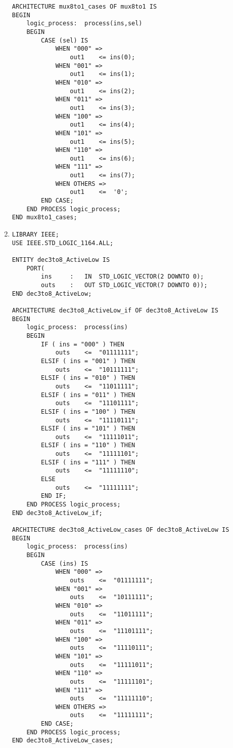 \begin{enumerate}
\begin{lstlisting}
ARCHITECTURE mux8to1_cases OF mux8to1 IS
BEGIN
	logic_process:	process(ins,sel) 
	BEGIN
		CASE (sel) IS
			WHEN "000" =>
				out1	<= ins(0);
			WHEN "001" =>
				out1	<= ins(1);
			WHEN "010" =>
				out1	<= ins(2);
			WHEN "011" =>
				out1	<= ins(3);
			WHEN "100" =>
				out1	<= ins(4);
			WHEN "101" =>
				out1	<= ins(5);
			WHEN "110" =>
				out1	<= ins(6);
			WHEN "111" =>
				out1	<= ins(7);
			WHEN OTHERS =>
				out1	<=	'0';
		END CASE;
	END PROCESS logic_process;
END mux8to1_cases;
	\end{lstlisting}

	\item
	\begin{lstlisting}
LIBRARY IEEE;
USE IEEE.STD_LOGIC_1164.ALL;

ENTITY dec3to8_ActiveLow IS
	PORT(
		ins		:	IN	STD_LOGIC_VECTOR(2 DOWNTO 0);
		outs	:	OUT	STD_LOGIC_VECTOR(7 DOWNTO 0));
END dec3to8_ActiveLow;

ARCHITECTURE dec3to8_ActiveLow_if OF dec3to8_ActiveLow IS
BEGIN
	logic_process:	process(ins) 
	BEGIN
		IF ( ins = "000" ) THEN
			outs	<=	"01111111";
		ELSIF ( ins = "001" ) THEN
			outs	<=	"10111111";
		ELSIF ( ins = "010" ) THEN
			outs	<=	"11011111";
		ELSIF ( ins = "011" ) THEN
			outs	<=	"11101111";
		ELSIF ( ins = "100" ) THEN
			outs	<=	"11110111";
		ELSIF ( ins = "101" ) THEN
			outs	<=	"11111011";
		ELSIF ( ins = "110" ) THEN
			outs	<=	"11111101";
		ELSIF ( ins = "111" ) THEN
			outs	<=	"11111110";
		ELSE
			outs	<=	"11111111";
		END IF;
	END PROCESS logic_process;
END dec3to8_ActiveLow_if;

ARCHITECTURE dec3to8_ActiveLow_cases OF dec3to8_ActiveLow IS
BEGIN
	logic_process:	process(ins) 
	BEGIN
		CASE (ins) IS
			WHEN "000" =>
				outs	<=	"01111111";
			WHEN "001" =>
				outs	<=	"10111111";
			WHEN "010" =>
				outs	<=	"11011111";
			WHEN "011" =>
				outs	<=	"11101111";
			WHEN "100" =>
				outs	<=	"11110111";
			WHEN "101" =>
				outs	<=	"11111011";
			WHEN "110" =>
				outs	<=	"11111101";
			WHEN "111" =>
				outs	<=	"11111110";
			WHEN OTHERS =>
				outs	<=	"11111111";
		END CASE;
	END PROCESS logic_process;
END dec3to8_ActiveLow_cases;
	\end{lstlisting}
\end{enumerate}

\setcounter{section}{7}
